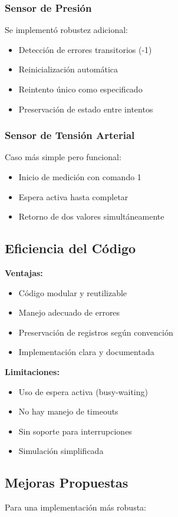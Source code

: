 \documentclass[12pt,a4paper]{article}
\begin{document}
\subsubsection{Sensor de Presión}
Se implementó robustez adicional:
\begin{itemize}
    \item Detección de errores transitorios (-1)
    \item Reinicialización automática
    \item Reintento único como especificado
    \item Preservación de estado entre intentos
\end{itemize}

\subsubsection{Sensor de Tensión Arterial}
Caso más simple pero funcional:
\begin{itemize}
    \item Inicio de medición con comando 1
    \item Espera activa hasta completar
    \item Retorno de dos valores simultáneamente
\end{itemize}

\subsection{Eficiencia del Código}
\textbf{Ventajas:}
\begin{itemize}
    \item Código modular y reutilizable
    \item Manejo adecuado de errores
    \item Preservación de registros según convención
    \item Implementación clara y documentada
\end{itemize}

\textbf{Limitaciones:}
\begin{itemize}
    \item Uso de espera activa (busy-waiting)
    \item No hay manejo de timeouts
    \item Sin soporte para interrupciones
    \item Simulación simplificada
\end{itemize}

\subsection{Mejoras Propuestas}
Para una implementación más robusta:
\end{document}
